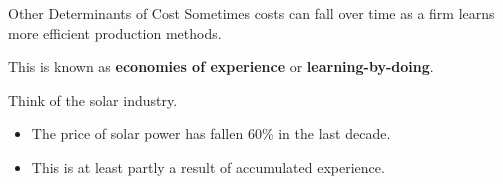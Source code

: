 \documentclass[11pt,t]{beamer}
\begin{document}
\begin{frame}{Other Determinants of Cost}
  Sometimes costs can fall over time as a firm learns more efficient production methods.

  This is known as \textbf{economies of experience} or \textbf{learning-by-doing}.

  \pause\bigskip
  Think of the solar industry.
  \begin{itemize}
    \item The price of solar power has fallen 60\% in the last decade.
 
    \item This is at least partly a result of accumulated experience.
  \end{itemize}
\end{frame}
\end{document}
